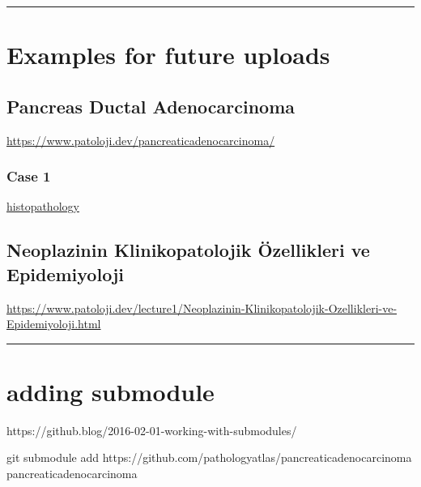 \documentclass[
  letterpaper,
  DIV=11,
  numbers=noendperiod]{scrreprt}
\newenvironment{Shaded}{}{}
\newcommand{\FunctionTok}[1]{\textcolor[rgb]{0.02,0.16,0.49}{#1}}
\newcommand{\NormalTok}[1]{#1}
\begin{document}
\begin{center}\rule{0.5\linewidth}{0.5pt}\end{center}

\hypertarget{examples-for-future-uploads}{%
\chapter{Examples for future
uploads}\label{examples-for-future-uploads}}

\hypertarget{pancreas-ductal-adenocarcinoma}{%
\section{Pancreas Ductal
Adenocarcinoma}\label{pancreas-ductal-adenocarcinoma}}

\url{https://www.patoloji.dev/pancreaticadenocarcinoma/}

\hypertarget{case-1}{%
\subsection{Case 1}\label{case-1}}

\href{https://www.patoloji.dev/pancreaticadenocarcinoma/case1-histopathology/viewer_z0.html}{histopathology}

\hypertarget{neoplazinin-klinikopatolojik-uxf6zellikleri-ve-epidemiyoloji}{%
\section{Neoplazinin Klinikopatolojik Özellikleri ve
Epidemiyoloji}\label{neoplazinin-klinikopatolojik-uxf6zellikleri-ve-epidemiyoloji}}

\url{https://www.patoloji.dev/lecture1/Neoplazinin-Klinikopatolojik-Ozellikleri-ve-Epidemiyoloji.html}

\begin{center}\rule{0.5\linewidth}{0.5pt}\end{center}

\hypertarget{adding-submodule}{%
\chapter{adding submodule}\label{adding-submodule}}

https://github.blog/2016-02-01-working-with-submodules/

\begin{Shaded}
\begin{Highlighting}[]
\FunctionTok{git}\NormalTok{ submodule add https://github.com/pathologyatlas/pancreaticadenocarcinoma pancreaticadenocarcinoma}
\end{Highlighting}
\end{Shaded}
\end{document}
